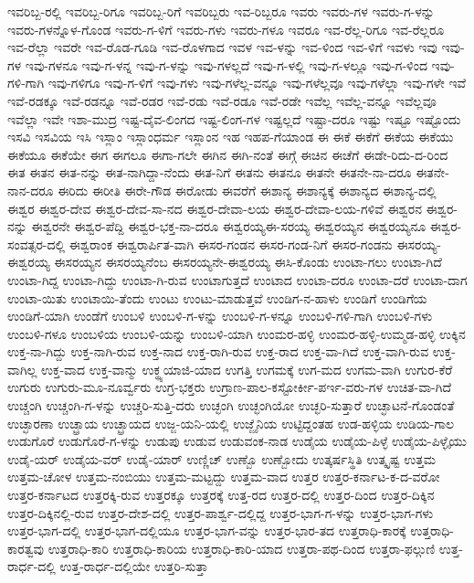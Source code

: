 ಇವರಿಬ್ಬ-ರಲ್ಲಿ
ಇವರಿಬ್ಬ-ರಿಗೂ
ಇವರಿಬ್ಬ-ರಿಗೆ
ಇವರಿಬ್ಬರು
ಇವ-ರಿಬ್ಬರೂ
ಇವರು
ಇವರು-ಗಳ
ಇವರು-ಗ-ಳನ್ನು
ಇವರು-ಗಳನ್ನೊಳ-ಗೊಂಡ
ಇವರು-ಗ-ಳಿಗೆ
ಇವರು-ಗಳು
ಇವರು-ಗಳೂ
ಇವರೂ
ಇವ-ರೆಲ್ಲ-ರಿಗೂ
ಇವ-ರೆಲ್ಲರೂ
ಇವ-ರೆಲ್ಲಾ
ಇವರೇ
ಇವ-ರೊಡ-ಗೂಡಿ
ಇವ-ರೊಳಗಾದ
ಇವಳ
ಇವ-ಳನ್ನು
ಇವ-ಳಿಂದ
ಇವ-ಳಿಗೆ
ಇವಳು
ಇವು
ಇವು-ಗಳ
ಇವು-ಗಳನೂ
ಇವು-ಗ-ಳನ್ನ
ಇವು-ಗ-ಳನ್ನು
ಇವು-ಗಳಲ್ಲದೆ
ಇವು-ಗ-ಳಲ್ಲಿ
ಇವು-ಗ-ಳಲ್ಲೂ
ಇವು-ಗ-ಳಿಂದ
ಇವು-ಗಳಿ-ಗಾಗಿ
ಇವು-ಗಳಿಗೂ
ಇವು-ಗ-ಳಿಗೆ
ಇವು-ಗಳು
ಇವು-ಗಳೆಲ್ಲ-ವನ್ನೂ
ಇವು-ಗಳೆಲ್ಲವೂ
ಇವು-ಗಳೆಲ್ಲಾ
ಇವು-ಗಳೇ
ಇವೆ
ಇವೆ-ರಡಕ್ಕೂ
ಇವೆ-ರಡನ್ನೂ
ಇವೆ-ರಡರ
ಇವೆ-ರಡು
ಇವೆ-ರಡೂ
ಇವೆ-ರಡೇ
ಇವೆಲ್ಲ
ಇವೆಲ್ಲ-ವನ್ನೂ
ಇವೆಲ್ಲವೂ
ಇವೆಲ್ಲಾ
ಇವೇ
ಇಶಾ-ಮುದ್ರ
ಇಷ್ಟ-ದೈವ-ಲಿಂಗದ
ಇಷ್ಟ-ಲಿಂಗ-ಗಳ
ಇಷ್ಟಲ್ಲದೆ
ಇಷ್ಟಾ-ದರೂ
ಇಷ್ಟು
ಇಷ್ಟೂ
ಇಷ್ಟೊಂದು
ಇಸವಿ
ಇಸವಿಯ
ಇಸಿ
ಇಸ್ಲಾಂ
ಇಸ್ಲಾಂಧರ್ಮ
ಇಸ್ಲಾಂನ
ಇಹ
ಇಹಪ-ಗೆಯಾಂಡ
ಈ
ಈಕೆ
ಈಕೆಗೆ
ಈಕೆಯ
ಈಕೆಯು
ಈಕೆಯೂ
ಈಕೆಯೇ
ಈಗ
ಈಗಲೂ
ಈಗಾ-ಗಲೇ
ಈಗಿನ
ಈಗಿ-ನಂತೆ
ಈಗ್ಗೆ
ಈಚಿನ
ಈಚೆಗೆ
ಈಡೇ-ರಿದು-ದ-ರಿಂದ
ಈತ
ಈತನ
ಈತ-ನನ್ನು
ಈತ-ನಾಗಿದ್ದಾ-ನೆಂದು
ಈತ-ನಿಗೆ
ಈತನು
ಈತನೂ
ಈತನೇ
ಈತನೇ-ನಾ-ದರೂ
ಈತನೇ-ನಾನ-ದರೂ
ಈರಿದು
ಈರೀತಿ
ಈರೇ-ಗೌಡ
ಈರೋಡು
ಈವರೆಗೆ
ಈಶಾನ್ಯ
ಈಶಾನ್ಯಕ್ಕೆ
ಈಶಾನ್ಯದ
ಈಶಾನ್ಯ-ದಲ್ಲಿ
ಈಶ್ವರ
ಈಶ್ವರ-ದೇವ
ಈಶ್ವರ-ದೇವ-ಸಾ-ನದ
ಈಶ್ವರ-ದೇವಾ-ಲಯ
ಈಶ್ವರ-ದೇವಾ-ಲಯ-ಗಳಿವೆ
ಈಶ್ವರನ
ಈಶ್ವರ-ನನ್ನು
ಈಶ್ವರನೇ
ಈಶ್ವರ-ಪೆದ್ದಿ
ಈಶ್ವರ-ಭಕ್ತ-ನಾ-ದರೂ
ಈಶ್ವರಯ್ಯಈ-ಸರಯ್ಯ
ಈಶ್ವರಯ್ಯನ
ಈಶ್ವರಯ್ಯನೂ
ಈಶ್ವರ-ಸಂವತ್ಸರ-ದಲ್ಲಿ
ಈಶ್ವರಾಂಕ
ಈಶ್ವರಾರ್ಪಿತ-ವಾಗಿ
ಈಸರ-ಗಂಡನ
ಈಸರ-ಗಂಡ-ನಿಗೆ
ಈಸರ-ಗಂಡನು
ಈಸರಯ್ಯ-ಈಶ್ವರಯ್ಯ
ಈಸರಯ್ಯನ
ಈಸರಯ್ಯನೆಂಬ
ಈಸರಯ್ಯನೇ-ಈಶ್ವರಯ್ಯ
ಈಸಿ-ಕೊಂಡು
ಉಂಟಾ-ಗಲು
ಉಂಟಾ-ಗಿದೆ
ಉಂಟಾ-ಗಿದ್ದ
ಉಂಟಾ-ಗಿದ್ದು
ಉಂಟಾ-ಗಿ-ರುವ
ಉಂಟಾಗುತ್ತದೆ
ಉಂಟಾದ
ಉಂಟಾ-ದರೂ
ಉಂಟಾ-ದರೆ
ಉಂಟಾ-ದಾಗ
ಉಂಟಾ-ಯಿತು
ಉಂಟಾಯಿ-ತೆಂದು
ಉಂಟು
ಉಂಟು-ಮಾಡುತ್ತವೆ
ಉಂಡಿಗ-ನ-ಹಾಳು
ಉಂಡಿಗೆ
ಉಂಡಿಗೆಯ
ಉಂಡಿಗೆ-ಯಾಗಿ
ಉಂಡೆಗೆ
ಉಂಬಳಿ
ಉಂಬಳಿ-ಗ-ಳನ್ನು
ಉಂಬಳಿ-ಗ-ಳನ್ನೂ
ಉಂಬಳಿ-ಗಳಿ-ಗಾಗಿ
ಉಂಬಳಿ-ಗಳು
ಉಂಬಳಿ-ಗಳೂ
ಉಂಬಳಿಯ
ಉಂಬಳಿ-ಯನ್ನು
ಉಂಬಳಿ-ಯಾಗಿ
ಉಂಮರ-ಹಳ್ಳಿ
ಉಂಮರ-ಹಳ್ಳಿ-ಉಮ್ಮಡ-ಹಳ್ಳಿ
ಉಕ್ಕಿನ
ಉಕ್ತ-ನಾ-ಗಿದ್ದು
ಉಕ್ತ-ನಾಗಿ-ರುವ
ಉಕ್ತ-ನಾದ
ಉಕ್ತ-ರಾಗಿ-ರುವ
ಉಕ್ತ-ರಾದ
ಉಕ್ತ-ವಾ-ಗಿದೆ
ಉಕ್ತ-ವಾಗಿ-ರುವ
ಉಕ್ತ-ವಾಗಿಲ್ಲ
ಉಕ್ತ-ವಾದ
ಉಕ್ತ-ವಾನ್ಮು
ಉಕ್ಥ್ಯಯಾಜಿ-ಯಾದ
ಉಗತ್ತಿ
ಉಗಮಕ್ಕೆ
ಉಗ-ಮದ
ಉಗಮ-ವಾಗಿ
ಉಗುರ-ಕೆರೆ
ಉಗುರು
ಉಗುರು-ಮೂ-ನೂರ್ವ್ವರು
ಉಗ್ರ-ಭಕ್ತರು
ಉಗ್ರಾಣ-ಪಾಲ-ಕಸ್ಟೋರ್ಕೀ-ಪರ್ಇ-ವರು-ಗಳ
ಉಚಿತ-ವಾ-ಗಿದೆ
ಉಚ್ಚಂಗಿ
ಉಚ್ಚಂಗಿ-ಗ-ಳನ್ನು
ಉಚ್ಚರಿ-ಸುತ್ತಿ-ದರು
ಉಚ್ಛಂಗಿ
ಉಚ್ಛಂಗಿಯೋ
ಉಚ್ಛರಿ-ಸುತ್ತಾರೆ
ಉಚ್ಛಾಟನೆ-ಗೊಂಡಂತೆ
ಉಚ್ಛಾರಣಾ
ಉಚ್ಛ್ರಾಯ
ಉಚ್ಛ್ರಾಯದ
ಉಜ್ಜ-ಯನಿ-ಯಲ್ಲಿ
ಉಜ್ಜೈನಿಯ
ಉಟ್ಟಿದ್ದಂತಹ
ಉಡ-ಹಳ್ಳಿಯ
ಉಡಿಯ-ಗಾಲ
ಉಡುಗೊರೆ
ಉಡುಗೊರೆ-ಗ-ಳನ್ನು
ಉಡುಪು
ಉಡುವ
ಉಡುವಂಕ-ನಾಡ
ಉಡೈಯ
ಉಡೈಯ-ಪಿಳ್ಳೆ
ಉಡೈಯ-ಪಿಳ್ಳೈಯು
ಉಡೈ-ಯರ್
ಉಡೈಯ-ವರ್
ಉಡೈ-ಯಾರ್
ಉಣ್ಣಿಚ್
ಉಣ್ಬೊ
ಉಣ್ಬೋದು
ಉತ್ಕರ್ಷಸ್ಥಿತಿ
ಉತ್ಕೃಷ್ಟ
ಉತ್ತಮ
ಉತ್ತಮ-ಚೋಳ
ಉತ್ತಮ-ನಂಬಿಯು
ಉತ್ತಮ-ಮಟ್ಟದ್ದು
ಉತ್ತಮ-ವಾದ
ಉತ್ತರ
ಉತ್ತರ-ಕರ್ನಾಟ-ಕ-ದ-ವರೋ
ಉತ್ತರ-ಕರ್ನಾಟದ
ಉತ್ತರಕ್ಕಿ-ರುವ
ಉತ್ತರಕ್ಕೂ
ಉತ್ತರಕ್ಕೆ
ಉತ್ತ-ರದ
ಉತ್ತರ-ದಲ್ಲಿ
ಉತ್ತರ-ದಿಂದ
ಉತ್ತರ-ದಿಕ್ಕಿನ
ಉತ್ತರ-ದಿಕ್ಕಿನಲ್ಲಿ-ರುವ
ಉತ್ತರ-ದೇಶ-ದಲ್ಲಿ
ಉತ್ತರ-ಪಾರ್ಶ್ವ-ದಲ್ಲಿದ್ದ
ಉತ್ತರ-ಭಾಗ-ಗ-ಳನ್ನು
ಉತ್ತರ-ಭಾಗ-ಗಳು
ಉತ್ತರ-ಭಾಗ-ದಲ್ಲಿ
ಉತ್ತರ-ಭಾಗ-ದಲ್ಲಿಯೂ
ಉತ್ತರ-ಭಾಗ-ವನ್ನು
ಉತ್ತರ-ಭಾರ-ತದ
ಉತ್ತರಾಧಿ-ಕಾರಕ್ಕೆ
ಉತ್ತರಾಧಿ-ಕಾರತ್ವವು
ಉತ್ತರಾಧಿ-ಕಾರಿ
ಉತ್ತರಾಧಿ-ಕಾರಿಯ
ಉತ್ತರಾಧಿ-ಕಾರಿ-ಯಾದ
ಉತ್ತರಾ-ಪಥ-ದಿಂದ
ಉತ್ತರಾ-ಫಲ್ಗುಣಿ
ಉತ್ತ-ರಾರ್ಧ-ದಲ್ಲಿ
ಉತ್ತ-ರಾರ್ಧ-ದಲ್ಲಿಯೇ
ಉತ್ತರಿ-ಸುತ್ತಾ
